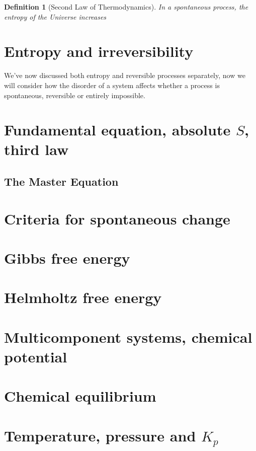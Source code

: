 \documentclass{article}
\numberwithin{theorem}{section}
\numberwithin{corollary}{section}
\numberwithin{postulate}{section}
\numberwithin{lemma}{section}
\newtheorem{definition}{Definition}
\numberwithin{definition}{section}
\begin{document}
\begin{definition}[Second Law of Thermodynamics]
  In a spontaneous process, the entropy of the Universe increases
\end{definition}

\section{Entropy and irreversibility}

We've now discussed both entropy and reversible processes separately, now we
will consider how the disorder of a system affects whether a process is
spontaneous, reversible or entirely impossible.

\section{Fundamental equation, absolute $S$, third law}

\subsection{The Master Equation}

\section{Criteria for spontaneous change}

\section{Gibbs free energy}

\section{Helmholtz free energy}

\section{Multicomponent systems, chemical potential}

\section{Chemical equilibrium}

\section{Temperature, pressure and $K_p$}
\end{document}
